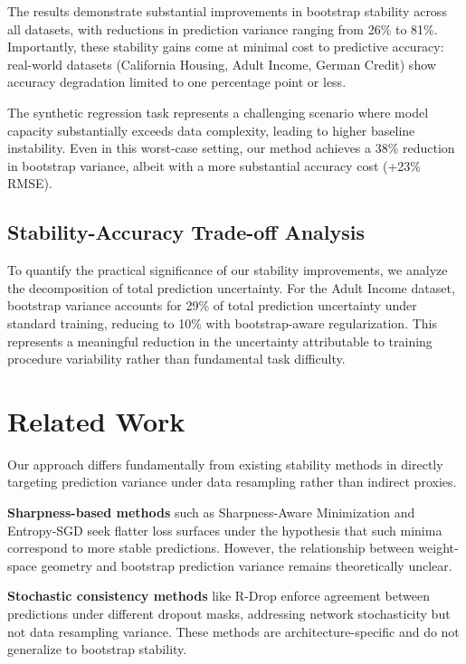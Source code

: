 \documentclass[12pt, letterpaper]{article}
\begin{document}
The results demonstrate substantial improvements in bootstrap stability across all datasets, with reductions in prediction variance ranging from 26\% to 81\%. Importantly, these stability gains come at minimal cost to predictive accuracy: real-world datasets (California Housing, Adult Income, German Credit) show accuracy degradation limited to one percentage point or less.

The synthetic regression task represents a challenging scenario where model capacity substantially exceeds data complexity, leading to higher baseline instability. Even in this worst-case setting, our method achieves a 38\% reduction in bootstrap variance, albeit with a more substantial accuracy cost (+23\% RMSE).

\subsection{Stability-Accuracy Trade-off Analysis}

To quantify the practical significance of our stability improvements, we analyze the decomposition of total prediction uncertainty. For the Adult Income dataset, bootstrap variance accounts for 29\% of total prediction uncertainty under standard training, reducing to 10\% with bootstrap-aware regularization. This represents a meaningful reduction in the uncertainty attributable to training procedure variability rather than fundamental task difficulty.

\section{Related Work}

Our approach differs fundamentally from existing stability methods in directly targeting prediction variance under data resampling rather than indirect proxies.

\textbf{Sharpness-based methods} such as Sharpness-Aware Minimization \cite{foret2020sharpness} and Entropy-SGD \cite{chaudhari2019entropy} seek flatter loss surfaces under the hypothesis that such minima correspond to more stable predictions. However, the relationship between weight-space geometry and bootstrap prediction variance remains theoretically unclear.

\textbf{Stochastic consistency methods} like R-Drop \cite{liang2021rdrop} enforce agreement between predictions under different dropout masks, addressing network stochasticity but not data resampling variance. These methods are architecture-specific and do not generalize to bootstrap stability.
\end{document}
